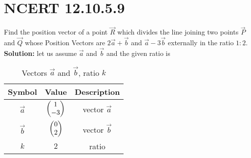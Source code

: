\documentclass[11pt]{book}
\begin{document}
\section{NCERT 12.10.5.9}

Find the position vector of a point $\vec{R}$ which divides the line joining two points $\vec{P}$ and $\vec{Q}$ whose Position Vectors are $2\vec{a}+\vec{b}$ and $\vec{a}-3\vec{b}$ externally in the ratio $1:2$. \\
\textbf{Solution:}
let us assume $\vec{a}$ and $\vec{b}$ and the given ratio is
\begin{table}[H]
\begin{center}
 \begin{tabular}{|c|c|c|}
	 \hline 
        \textbf{Symbol} & \textbf{Value} & \textbf{Description} \\
        \hline
	    $\vec{a}$ & $\begin{pmatrix}1 \\ -3\end{pmatrix}$ & vector $\vec{a}$ \\
        \hline
	    $\vec{b}$ & $\begin{pmatrix}0 \\ 2\end{pmatrix}$ & vector $\vec{b}$\\
        \hline
        $k$ & $2$ & ratio \\
        \hline
    \end{tabular}
    \end{center}
    \captionsetup{justification=centering} %
    \caption{Vectors $\vec{a}$ and $\vec{b}$, ratio $k$}
    \label{tab:table1}
\end{table}
\end{document}
